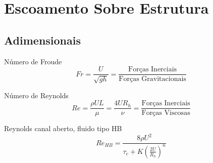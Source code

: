 \section{Escoamento Sobre Estrutura}

\subsection{Adimensionais}

\begin{frame}
    
   \begin{exampleblock}{Número de Froude}
        \begin{equation}
            Fr = \frac{U}{\sqrt{gh}} 
            = \frac{\text{Forças Inerciais}}{\text{Forças Gravitacionais}}
        \end{equation}        
    \end{exampleblock}

    \begin{exampleblock}{Número de Reynolds}
        \begin{equation}
            Re = \frac{\rho U L}{\mu} = \frac{4UR_h}{\nu} 
            = \frac{\text{Forças Inerciais}}{\text{Forças Viscosas}}
        \end{equation}        
    \end{exampleblock}

    \begin{exampleblock}{Reynolds canal aberto, fluido tipo HB}
        \begin{equation}
            Re_{HB} = \frac{8 \rho U^2}{\tau_c + K \left( \frac{2U}{R_h} \right)^n}
        \end{equation}
    \end{exampleblock}

\end{frame}



